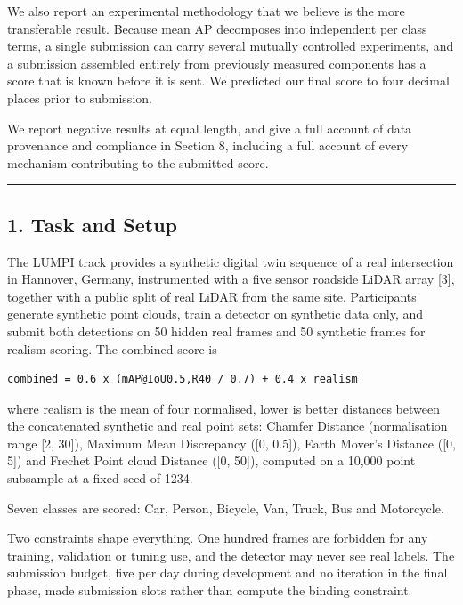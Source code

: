 \documentclass[
  10pt,
]{article}
\begin{document}
We also report an experimental methodology that we believe is the more
transferable result. Because mean AP decomposes into independent per
class terms, a single submission can carry several mutually controlled
experiments, and a submission assembled entirely from previously
measured components has a score that is known before it is sent. We
predicted our final score to four decimal places prior to submission.

We report negative results at equal length, and give a full account of
data provenance and compliance in Section 8, including a full account of
every mechanism contributing to the submitted score.

\begin{center}\rule{0.5\linewidth}{0.5pt}\end{center}

\subsection{1. Task and Setup}\label{task-and-setup}

The LUMPI track provides a synthetic digital twin sequence of a real
intersection in Hannover, Germany, instrumented with a five sensor
roadside LiDAR array {[}3{]}, together with a public split of real LiDAR
from the same site. Participants generate synthetic point clouds, train
a detector on synthetic data only, and submit both detections on 50
hidden real frames and 50 synthetic frames for realism scoring. The
combined score is

\begin{verbatim}
combined = 0.6 x (mAP@IoU0.5,R40 / 0.7) + 0.4 x realism
\end{verbatim}

where realism is the mean of four normalised, lower is better distances
between the concatenated synthetic and real point sets: Chamfer Distance
(normalisation range {[}2, 30{]}), Maximum Mean Discrepancy ({[}0,
0.5{]}), Earth Mover's Distance ({[}0, 5{]}) and Frechet Point cloud
Distance ({[}0, 50{]}), computed on a 10,000 point subsample at a fixed
seed of 1234.

Seven classes are scored: Car, Person, Bicycle, Van, Truck, Bus and
Motorcycle.

Two constraints shape everything. One hundred frames are forbidden for
any training, validation or tuning use, and the detector may never see
real labels. The submission budget, five per day during development and
no iteration in the final phase, made submission slots rather than
compute the binding constraint.
\end{document}
